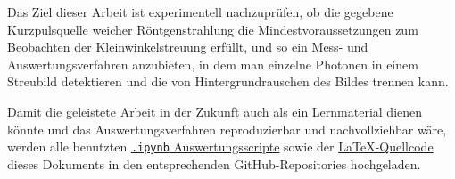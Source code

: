 \noindent
Das Ziel dieser Arbeit ist experimentell nachzuprüfen, ob die gegebene Kurzpulsquelle weicher Röntgenstrahlung die Mindestvoraussetzungen zum Beobachten der Kleinwinkelstreuung erfüllt, und so ein Mess- und Auswertungsverfahren anzubieten, in dem man einzelne Photonen in einem Streubild detektieren und die von Hintergrundrauschen des Bildes trennen kann.

\noindent
Damit die geleistete Arbeit in der Zukunft auch als ein Lernmaterial dienen könnte und das Auswertungsverfahren reproduzierbar und nachvollziehbar wäre, werden alle benutzten \href{https://github.com/lrlunin/bachelorarbeit_python_notebooks_and_data/}{\color{blue}\texttt{.ipynb} Auswertungsscripte} sowie der \href{https://github.com/lrlunin/Bachelorarbeit/}{\color{blue}\LaTeX-Quellcode} dieses Dokuments in den entsprechenden GitHub-Repositories hochgeladen.   




